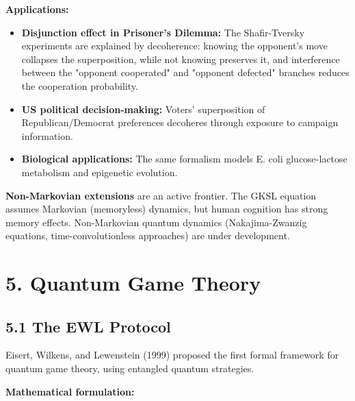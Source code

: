 \documentclass[11pt]{article}
\begin{document}
\textbf{Applications:}
\begin{itemize}
\item \textbf{Disjunction effect in Prisoner's Dilemma:} The Shafir-Tversky experiments
are explained by decoherence: knowing the opponent's move collapses the
superposition, while not knowing preserves it, and interference between
the "opponent cooperated" and "opponent defected" branches reduces the
cooperation probability.
\item \textbf{US political decision-making:} Voters' superposition of Republican/Democrat
preferences decoheres through exposure to campaign information.
\item \textbf{Biological applications:} The same formalism models E. coli glucose-lactose
metabolism and epigenetic evolution.
\end{itemize}

\textbf{Non-Markovian extensions} are an active frontier. The GKSL equation assumes
Markovian (memoryless) dynamics, but human cognition has strong memory effects.
Non-Markovian quantum dynamics (Nakajima-Zwanzig equations, time-convolutionless
approaches) are under development.
\section{5. Quantum Game Theory}
\label{sec:org8b8b78e}

\subsection{5.1 The EWL Protocol}
\label{sec:orgca6e979}

Eisert, Wilkens, and Lewenstein (1999) proposed the first formal framework for
quantum game theory, using entangled quantum strategies.

\textbf{Mathematical formulation:}
\end{document}
